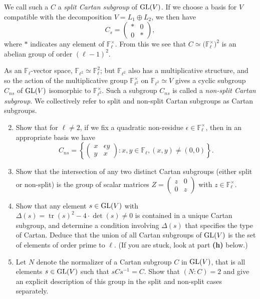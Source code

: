 \documentclass[11pt]{article}
\newcommand{\F}{\mathbb{F}}
\newcommand{\GL}{{\rm GL}}
\newcommand{\tr}{\operatorname{tr}}
\theoremstyle{definition}
\begin{document}
We call such a $C$ a \emph{split Cartan subgroup} of $\GL(V)$.  If we choose a basis for $V$ compatible with the decomposition $V = L_1 \oplus L_2$, we then have
\[
C_s = \begin{pmatrix} \ast & 0 \\ 0 & \ast \end{pmatrix},
\]
where $\ast$ indicates any element of $\F_\ell^\times$.  From this we see that $C \simeq \big(\F_\ell^\times \big)^2$ is an abelian group of order $(\ell-1)^2$.

As an $\F_\ell$-vector space, $\F_{\ell^2} \simeq \F_\ell^2$; but $\F_{\ell^2}$ also has a multiplicative structure, and so the action of the multiplicative group $\F_{\ell^2}^\times$ on $\F_{\ell^2} \simeq V$ gives a cyclic subgroup $C_{ns}$ of $\GL(V)$ isomorphic to $\F_{\ell^2}^\times$.  Such a subgroup $C_{ns}$ is called a \emph{non-split Cartan subgroup}.
We collectively refer to split and non-split Cartan subgroups as Cartan subgroups.
 
\begin{enumerate}[{\bf(a)}]
\setcounter{enumi}{1}
 
\item Show that for $\ell \neq 2$, if we fix a quadratic non-residue $\epsilon \in \F_\ell^\times$, then in an appropriate basis we have
\[
C_{ns} = \left\{ \begin{pmatrix} x &  \epsilon y \\ y & x \end{pmatrix} : x, y \in \F_\ell, (x,y) \neq (0,0) \right\}.
\]

\item Show that the intersection of any two distinct Cartan subgroups (either split or non-split) is the group of scalar matrices $Z=\left(\begin{smallmatrix}z&0\\0&z\end{smallmatrix}\right)$ with $z\in\F_\ell^\times$.

\item Show that any element $s \in \GL(V)$ with $\Delta(s) = \tr(s)^2 - 4 \cdot \det(s) \neq 0$ is contained in a unique Cartan subgroup, and determine a condition involving $\Delta(s)$ that specifies the type of Cartan.  Deduce that the union of all Cartan subgroups of $\GL(V)$ is the set of elements of order prime to $\ell$.  (If you are stuck, look at part {\bf{(h)}} below.)

\item Let $N$ denote the normalizer of a Cartan subgroup $C$ in $\GL(V)$, that is all elements $s \in \GL(V)$ such that $s C s^{-1} = C$.  Show that $(N : C) = 2$ and give an explicit description of this group in the split and non-split cases separately.

\end{enumerate}
\end{document}

